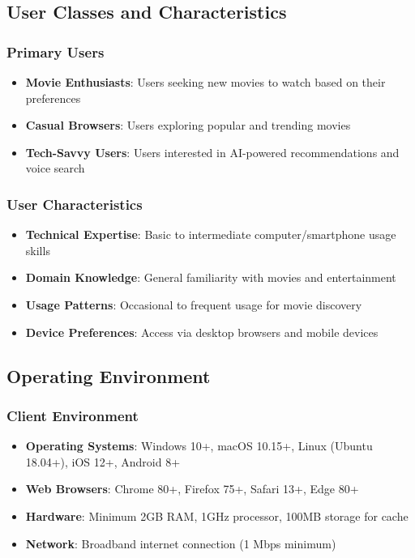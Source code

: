 \documentclass[12pt,a4paper]{article}
\begin{document}
\subsection{User Classes and Characteristics}

\subsubsection{Primary Users}
\begin{itemize}
    \item \textbf{Movie Enthusiasts}: Users seeking new movies to watch based on their preferences
    \item \textbf{Casual Browsers}: Users exploring popular and trending movies
    \item \textbf{Tech-Savvy Users}: Users interested in AI-powered recommendations and voice search
\end{itemize}

\subsubsection{User Characteristics}
\begin{itemize}
    \item \textbf{Technical Expertise}: Basic to intermediate computer/smartphone usage skills
    \item \textbf{Domain Knowledge}: General familiarity with movies and entertainment
    \item \textbf{Usage Patterns}: Occasional to frequent usage for movie discovery
    \item \textbf{Device Preferences}: Access via desktop browsers and mobile devices
\end{itemize}

\subsection{Operating Environment}

\subsubsection{Client Environment}
\begin{itemize}
    \item \textbf{Operating Systems}: Windows 10+, macOS 10.15+, Linux (Ubuntu 18.04+), iOS 12+, Android 8+
    \item \textbf{Web Browsers}: Chrome 80+, Firefox 75+, Safari 13+, Edge 80+
    \item \textbf{Hardware}: Minimum 2GB RAM, 1GHz processor, 100MB storage for cache
    \item \textbf{Network}: Broadband internet connection (1 Mbps minimum)
\end{itemize}
\end{document}

